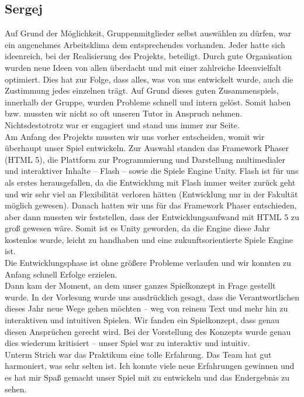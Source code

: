 \documentclass[10pt,a4paper,notitlepage]{report}
\begin{document}
	\subsection{Sergej}
	Auf Grund der Möglichkeit, Gruppenmitglieder selbst auswählen zu dürfen, war ein angenehmes Arbeitsklima dem entsprechendes vorhanden. Jeder hatte sich ideenreich, bei der Realisierung des Projekts, beteiligt. Durch gute Organisation wurden neue Ideen von allen überdacht und mit einer zahlreiche Ideenvielfalt optimiert. Dies hat zur Folge, dass alles, was von uns entwickelt wurde, auch die Zustimmung jedes einzelnen trägt. Auf Grund dieses guten Zusammenspiels, innerhalb der Gruppe, wurden Probleme schnell und intern gelöst. Somit haben bzw. mussten wir nicht so oft unseren Tutor in Anspruch nehmen. Nichtsdestotrotz war er engagiert und stand uns immer zur Seite.\\
	Am Anfang des Projekts mussten wir uns vorher entscheiden, womit wir überhaupt unser Spiel entwickeln. Zur Auswahl standen das Framework Phaser (HTML 5), die Plattform zur Programmierung und Darstellung multimedialer und interaktiver Inhalte – Flash – sowie die Spiele Engine Unity. Flash ist für uns als erstes herausgefallen, da die Entwicklung mit Flash immer weiter zurück geht und wir sehr viel an Flexibilität verloren hätten (Entwicklung nur in der Fakultät möglich gewesen). Danach hatten wir uns für das Framework Phaser entschieden, aber dann mussten wir feststellen, dass der Entwicklungsaufwand mit HTML 5 zu groß gewesen wäre. Somit ist es Unity geworden, da die Engine diese Jahr kostenlos wurde, leicht zu handhaben und eine zukunftsorientierte Spiele Engine ist.\\ 
	Die Entwicklungsphase ist ohne größere Probleme verlaufen und wir konnten zu Anfang schnell Erfolge erzielen.\\ 
	Dann kam der Moment, an dem unser ganzes Spielkonzept in Frage gestellt wurde. In der Vorlesung wurde uns ausdrücklich gesagt, dass die Verantwortlichen dieses Jahr neue Wege gehen möchten – weg von reinem Text und mehr hin zu interaktiven und intuitiven Spielen. Wir fanden ein Spielkonzept, dass genau diesen Ansprüchen gerecht wird. Bei der Vorstellung des Konzepts wurde  genau dies wiederum kritisiert – unser Spiel war zu interaktiv und intuitiv.\\
	Unterm Strich war das Praktikum eine tolle Erfahrung. Das Team hat gut harmoniert, was sehr selten ist. Ich konnte viele neue Erfahrungen gewinnen und es hat mir Spaß gemacht unser Spiel mit zu entwickeln und das Endergebnis zu sehen.\\
	\\
	\Fusszeile
\end{document}
